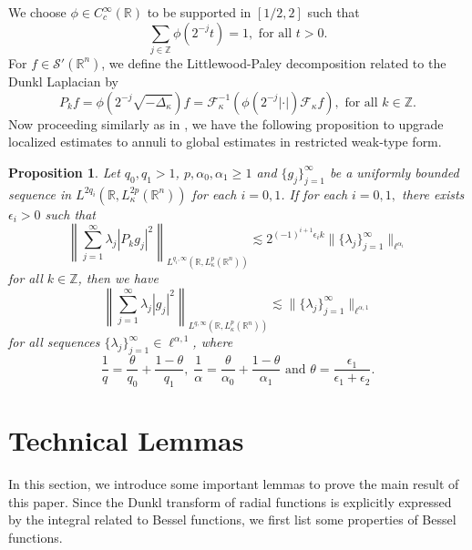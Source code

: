 \documentclass[a4paper,11pt, reqno]{amsart}
\numberwithin{equation}{section}
\theoremstyle{plain}
\newtheorem{proposition}[theorem]{Proposition}
\theoremstyle{definition}
\theoremstyle{remark}
\begin{document}
We choose $\phi\in C_c^\infty(\mathbb{R})$ to be supported in $[1/2,2]$ such that 
	\begin{equation*}
\underset{j\in \mathbb{Z}}{\sum}\phi(2^{-j}t)=1, \text{ for all } t>0.
	\end{equation*}
For $f\in \mathcal{S}'\left(\mathbb{R}^{n}\right)$, we define the Littlewood-Paley decomposition related to the Dunkl Laplacian by
\begin{equation*}
    P_kf=\phi(2^{-j}\sqrt{-\Delta_\kappa})f=\mathcal{F}_\kappa^{-1}\left(\phi(2^{-j}|\cdot|)\mathcal{F}_\kappa f\right), \text{ for all }  k\in\mathbb{Z}.
\end{equation*}
 Now proceeding similarly as in \cite{Bez-Hong-Lee-Nakamura-Sawano}, we have the following proposition to upgrade localized estimates to annuli to global estimates in restricted weak-type form.
\begin{proposition}\label{upgrading}
    Let $q_0,q_1>1$, $p,\alpha_0,\alpha_1\geq1$ and $\{g_j\}_{j=1}^\infty$ be a uniformly bounded sequence in $L^{2q_i}(\mathbb{R},L_\kappa^{2p}(\mathbb{R}^n))$ for each $i=0,1$. If for each $i=0,1,$ there exists $\epsilon_i>0$ such that
    \begin{equation*}
        \left\|\sum_{j=1}^\infty \lambda_j|P_kg_j|^2\right\|_{L^{q_i,\infty}(\mathbb{R},L_\kappa^{p}(\mathbb{R}^n))}\lesssim 2^{(-1)^{i+1}\epsilon_i k}\|\{\lambda_j\}^\infty_{j=1}\|_{\ell^{\alpha_i}}
    \end{equation*}
    for all $k\in\mathbb{Z}$, then we have
    \begin{equation*}
        \left\|\sum_{j=1}^\infty \lambda_j|g_j|^2\right\|_{L^{q,\infty}(\mathbb{R},L_\kappa^{p}(\mathbb{R}^n))}\lesssim \|\{\lambda_j\}^\infty_{j=1}\|_{\ell^{\alpha,1}}
    \end{equation*}
    for all sequences $\{\lambda_j\}^\infty_{j=1}\in \ell^{\alpha,1}$, where
    \begin{equation*}
        \frac{1}{q}=\frac{\theta}{q_0}+\frac{1-\theta}{q_1},\;\frac{1}{\alpha}=\frac{\theta}{\alpha_0}+\frac{1-\theta}{\alpha_1} \text{ and } \theta=\frac{\epsilon_1}{\epsilon_1+\epsilon_2}.
    \end{equation*}
\end{proposition}


\section{Technical Lemmas}\label{sec3}
In this section, we introduce some important lemmas to prove the main result of this paper.  Since the Dunkl transform of radial functions is explicitly expressed by the integral related to Bessel functions, we first list some properties of Bessel functions.\\
\end{document}
